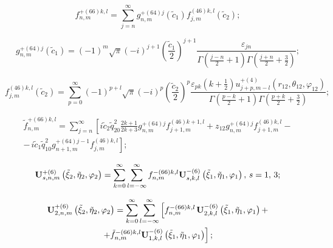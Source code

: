 \begin{equation}
f_{n,m}^{ + (66)k,l} = \sum\limits_{j = n}^\infty  {g_{n,m}^{ + (64)j}} ({\tilde c_1})f_{j,m}^{(46)k,l}({\tilde c_2});
\end{equation}

\begin{equation}
g_{n,m}^{ + (64)j}({\tilde c_1}) = {( - 1)^m}\sqrt \pi  {( - i)^{j + 1}}{\left( {\frac{{{{\tilde c}_1}}}{2}} \right)^{j + 1}}\frac{{{\varepsilon _{jn}}}}{{\Gamma \left( {\frac{{j - n}}{2} + 1} \right)\Gamma \left( {\frac{{j + n}}{2} + \frac{3}{2}} \right)}};
\end{equation}

\begin{equation}
f_{j,m}^{(46)k,l}({\tilde c_2}) = \sum\limits_{p = 0}^\infty  {{{( - 1)}^{p + l}}} \sqrt \pi  {( - i)^p}{\left( {\frac{{{{\tilde c}_2}}}{2}} \right)^p}\frac{{{\varepsilon _{pk}}\left( {k + \frac{1}{2}} \right)u_{j + p,m - l}^{ + (4)}\left( {{r_{12}},{\theta _{12}},{\varphi _{12}}} \right)}}{{\Gamma \left( {\frac{{p - k}}{2} + 1} \right)\Gamma \left( {\frac{{p + k}}{2} + \frac{3}{2}} \right)}};
\end{equation}

\begin{multline}
\tilde f_{n,m}^{ + (66)k,l} = \sum\limits_{j = n}^\infty  {\left[ {i{{\tilde c}_2}\tilde q_{20}^2\frac{{2k + 1}}{{2k + 3}}} \right.} g_{n,m}^{ + (64)j}f_{j + 1,m}^{(46)k + 1,l} + {z_{12}}g_{n,m}^{ + (64)j}f_{j + 1,m}^{(46)k,l} - \\
\left. {-\frac{{}}{{}}i{{\tilde c}_1}\tilde q_{10}^2g_{n + 1,m}^{ + (64)j - 1}f_{j,m}^{(46)k,l}} \right];
\end{multline}

\begin{equation}
{\bf{U}}_{s,n,m}^{ + (6)}\left( {{{\tilde \xi }_2},{{\tilde \eta }_2},{\varphi _2}} \right) = \sum\limits_{k = 0}^\infty  {\sum\limits_{l =  - \infty }^\infty  {f_{n,m}^{ - (66)k,l}} } {\bf{U}}_{s,k,l}^{ - (6)}\left( {{{\tilde \xi }_1},{{\tilde \eta }_1},{\varphi _1}} \right),\,s = 1,{\mkern 1mu} {\kern 1pt} 3;
\label{eq:10:6}
\end{equation}

\begin{multline}
{\bf{U}}_{2,n,m}^{ + (6)}\left( {{{\tilde \xi }_2},{{\tilde \eta }_2},{\varphi _2}} \right) = \sum\limits_{k = 0}^\infty  {\sum\limits_{l =  - \infty }^\infty  {\left[ {f_{n,m}^{ - (66)k,l}} \right.} } {\bf{U}}_{2,k,l}^{ - (6)}\left( {{{\tilde \xi }_1},{{\tilde \eta }_1},{\varphi _1}} \right) + \\
\left. { + \tilde f_{n,m}^{ - (66)k,l}{\bf{U}}_{1,k,l}^{ - (6)}\left( {{{\tilde \xi }_1},{{\tilde \eta }_1},{\varphi _1}} \right)} \right];
\label{eq:10:7}
\end{multline}

